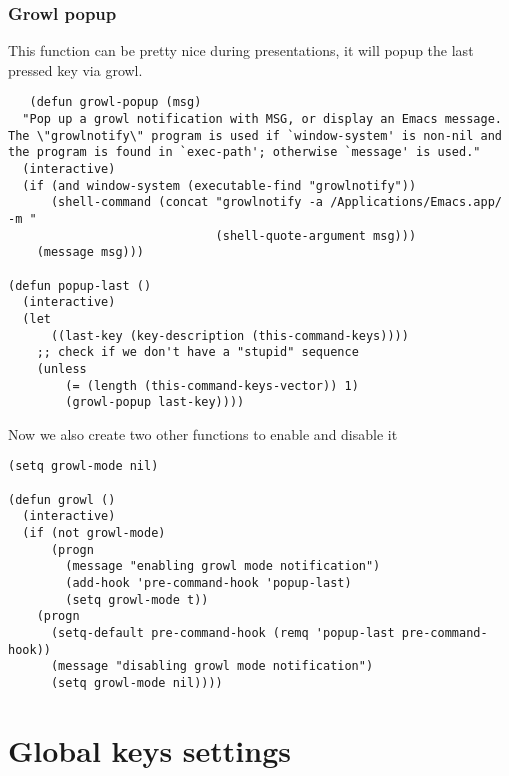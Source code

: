 \documentclass[11pt]{article}
\begin{document}
\subsubsection{Growl popup}
\label{sec-41.2.2}

   This function can be pretty nice during presentations, it will popup the last pressed key via growl.
\begin{verbatim}
   (defun growl-popup (msg)
  "Pop up a growl notification with MSG, or display an Emacs message.
The \"growlnotify\" program is used if `window-system' is non-nil and
the program is found in `exec-path'; otherwise `message' is used."
  (interactive)
  (if (and window-system (executable-find "growlnotify"))
      (shell-command (concat "growlnotify -a /Applications/Emacs.app/ -m "
                             (shell-quote-argument msg)))
    (message msg)))

(defun popup-last ()
  (interactive)
  (let
      ((last-key (key-description (this-command-keys))))
    ;; check if we don't have a "stupid" sequence
    (unless
        (= (length (this-command-keys-vector)) 1)
        (growl-popup last-key))))
\end{verbatim}


  Now we also create two other functions to enable and disable it
\begin{verbatim}
(setq growl-mode nil)

(defun growl ()
  (interactive)
  (if (not growl-mode)
      (progn
        (message "enabling growl mode notification")
        (add-hook 'pre-command-hook 'popup-last)
        (setq growl-mode t))
    (progn
      (setq-default pre-command-hook (remq 'popup-last pre-command-hook))
      (message "disabling growl mode notification")
      (setq growl-mode nil))))
\end{verbatim}

      
\section{Global keys settings}
\label{sec-42}
\end{document}
